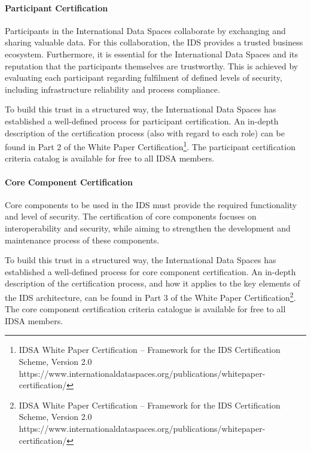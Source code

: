 \paragraph{Participant Certification \\ }

Participants in the International  Data Spaces collaborate by exchanging and sharing valuable data. For this collaboration, the IDS provides a trusted business ecosystem. Furthermore, it is essential for the  International  Data Spaces and its reputation that the participants themselves are trustworthy. This is achieved by evaluating each participant regarding fulfilment of defined levels of security, including infrastructure reliability and process compliance. 


To build this trust in a structured way, the International Data Spaces has established a well-defined process for participant certification. An in-depth description of the certification process (also with regard to each role) can be found in Part 2 of the White Paper Certification\footnote{ IDSA White Paper Certification – Framework for the IDS Certification Scheme, Version 2.0 https://www.internationaldataspaces.org/publications/whitepaper-certification/ }. The participant certification criteria catalog is available for free to all IDSA members. \par


\paragraph{Core Component Certification \\}

Core components to be used in the IDS must provide the required functionality and level of security. The certification of core components focuses on interoperability and security, while aiming to strengthen the development and maintenance process of these components.

To build this trust in a structured way, the International Data Spaces has established a well-defined process for core component certification. An in-depth description of the certification process, and how it applies to the key elements of the IDS architecture, can be found in Part 3 of the White Paper Certification\footnote{IDSA White Paper Certification – Framework for the IDS Certification Scheme, Version 2.0 https://www.internationaldataspaces.org/publications/whitepaper-certification/ }. The core component certification criteria catalogue is available for free to all IDSA members.
